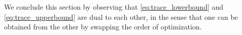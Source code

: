 \documentclass[letterpaper, 10 pt, conference]{ieeeconf}  %
\theoremstyle{ieeeconf}
\newtheorem{remark}{Remark}
\newcommand{\Prob}{\mathbb{P}}
\newcommand{\E}{\mathbb{E}}
\begin{document}
We conclude this section by observing that \eqref{eq:trace_lowerbound} and \eqref{eq:trace_upperbound} are dual to each other, in the sense that one can be obtained from the other by swapping the order of optimization.

\end{document}

